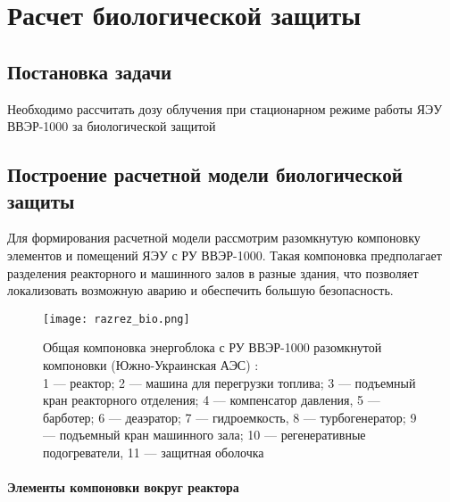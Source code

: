 \section{Расчет биологической защиты} %
\subsection{Постановка задачи}
Необходимо рассчитать дозу облучения при стационарном режиме работы ЯЭУ ВВЭР-1000 за биологической защитой

\subsection{Построение расчетной модели биологической защиты}
Для формирования расчетной модели рассмотрим разомкнутую компоновку элементов и помещений ЯЭУ с РУ ВВЭР-1000. Такая компоновка предполагает разделения реакторного и машинного залов в разные здания, что позволяет локализовать возможную аварию и обеспечить большую безопасность.

\begin{figure}[H]
	\begin{center}
		\texttt{[image: razrez\_bio.png]}
		\caption{
			Общая компоновка энергоблока с РУ ВВЭР-1000 разомкнутой компоновки (Южно-Украинская АЭС) \cite{МонаховА.С1986Аэси}: \\
			1 — реактор; 2 — машина для перегрузки топлива; 3 — подъемный кран реакторного отделения; 4 — компенсатор давления, 5 — барботер; 6 — деаэратор; 7 — гидроемкость, 8 — турбогенератор; 9 — подъемный кран машинного зала; 10 — регенеративные подогреватели, 11 —  защитная оболочка
		}
		\label{pic:razrez_bio} %
	\end{center}
\end{figure}

\paragraph{Элементы компоновки вокруг реактора}

